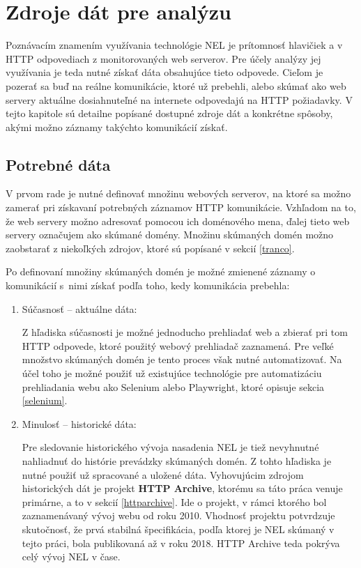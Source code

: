 \chapter{Zdroje dát pre analýzu}
\label{data-sources-available-for-research}

Poznávacím znamením využívania technológie NEL je prítomnosť hlavičiek  a  v HTTP odpovediach z monitorovaných web serverov. 
Pre účely analýzy jej využívania je teda nutné získať dáta obsahujúce tieto odpovede.
Cieľom je pozerať sa buď na reálne komunikácie, ktoré už prebehli, alebo skúmať ako web servery aktuálne dosiahnuteľné na internete
odpovedajú na HTTP požiadavky. 
V tejto kapitole sú detailne popísané dostupné zdroje dát a konkrétne spôsoby, akými možno záznamy takýchto komunikácií získať.

\section{Potrebné dáta}

V prvom rade je nutné definovať množinu webových serverov, na ktoré sa možno zamerať pri získavaní potrebných záznamov HTTP komunikácie.
Vzhľadom na to, že web servery možno adresovať pomocou ich doménového mena, ďalej tieto web servery označujem ako skúmané domény.
Množinu skúmaných domén možno zaobstarať z niekoľkých zdrojov, ktoré sú popísané v sekcií \ref{tranco}.

Po definovaní množiny skúmaných domén je možné zmienené záznamy o komunikácií \mbox{s nimi} získať podľa toho, kedy komunikácia prebehla:
\begin{enumerate}
    \item Súčasnosť -- aktuálne dáta:
    
    Z hľadiska súčasnosti je možné jednoducho prehliadať web a zbierať pri tom HTTP odpovede, ktoré použitý webový prehliadač zaznamená. 
    Pre veľké množstvo skúmaných domén je tento proces však nutné automatizovať.
    Na účel toho je možné použiť už existujúce technológie pre automatizáciu prehliadania webu ako Selenium alebo Playwright, ktoré opisuje sekcia \ref{selenium}.

    \item Minulosť -- historické dáta:

    Pre sledovanie historického vývoja nasadenia NEL je tiež nevyhnutné nahliadnuť do histórie prevádzky skúmaných domén. 
    Z tohto hľadiska je nutné použiť už spracované a uložené dáta. 
    Vyhovujúcim zdrojom historických dát je projekt \textbf{HTTP Archive}, ktorému sa táto práca venuje primárne, a to v sekcií \ref{httparchive}.
    Ide o projekt, v rámci ktorého bol zaznamenávaný vývoj webu od roku 2010. Vhodnosť projektu potvrdzuje skutočnosť, že prvá stabilná špecifikácia, podľa ktorej je NEL skúmaný v tejto práci, bola publikovaná až v roku 2018. HTTP Archive teda pokrýva celý vývoj NEL v čase.
\end{enumerate}

